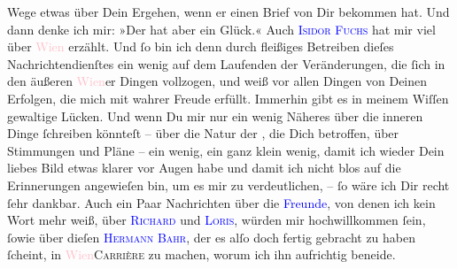                Wege etwas über Dein Ergehen, wenn er einen Brief von Dir bekommen hat. Und dann
               denke ich mir: »Der hat aber ein Glück.« Auch \textsc{\textcolor{blue}{Isidor Fuchs}{}\ledrightnote{\textcolor{blue}{Isidor Fuchs}}} hat mir viel über \textcolor{pink}{Wien}{}\ledrightnote{\textcolor{pink}{Wien}} erzählt. Und ſo  bin ich denn durch fleißiges  Betreiben
               dieſes Nachrichtendienſtes ein wenig auf dem Laufenden der Veränderungen, die ſich in
               den äußeren \textcolor{pink}{Wien}{}\ledrightnote{\textcolor{pink}{Wien}}er Dingen vollzogen, und weiß vor
               allen Dingen von Deinen Erfolgen, die mich mit wahrer Freude {\pb}erfüllt. Immerhin gibt es in meinem Wiſſen gewaltige
               Lücken. Und wenn Du mir nur ein wenig Näheres über die inneren Dinge ſchreiben
               könnteſt – über die Natur der \label{K_L02708-3v}\label{K_L02708-3h}, die Dich
               betroffen, über Stimmungen und Pläne – ein wenig, ein ganz klein wenig, damit ich
               wieder Dein liebes Bild etwas klarer vor Augen habe und damit ich nicht blos auf die
               Erinnerungen angewieſen bin, um es mir zu verdeutlichen, – ſo wäre ich Dir recht ſehr
               dankbar.\pend
           \pstart
           Auch ein Paar Nachrichten über die \textcolor{blue}{Freunde}{}, von denen ich kein Wort mehr weiß, über
                  \textsc{\textcolor{blue}{Richard}{}\ledrightnote{\textcolor{blue}{Richard Beer-Hofmann}}} und {\pb}\textsc{\textcolor{blue}{Loris}{}\ledrightnote{\textcolor{blue}{Hugo von Hofmannsthal}}}, würden mir hochwillkommen ſein, ſowie über dieſen \label{K_L02708-4v}\label{K_L02708-4h}{ }\textsc{\textcolor{blue}{Hermann Bahr}{}\ledrightnote{\textcolor{blue}{Hermann Bahr}}}, der \strikeout{\textcolor{gray}{×}} es alſo doch fertig gebracht zu haben ſcheint, in \textcolor{pink}{Wien}{}\ledrightnote{\textcolor{pink}{Wien}}{ }\textsc{Carrière} zu machen, worum ich ihn aufrichtig beneide.\pend
